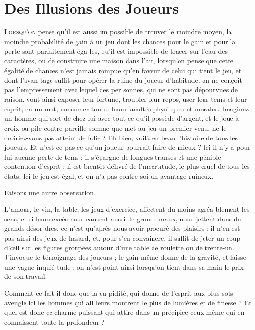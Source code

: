\chapter{Des Illusions des Joueurs}

\lettrine{L}{orsqu'on} pense qu'il est aussi im%
possible de trouver le moindre moyen,
la moindre probabilité de gain à un
jeu dont les chances pour le gain et
pour la perte sont parfaitement éga%
les, qu'il est impossible de tracer sur
l'eau des caractères, ou de construire
une maison dans l'air, lorsqu'on
pense que cette égalité de chances
n'est jamais rompue qu'en faveur de
celui qui tient le jeu, et dont l'avan%
tage suffit pour opérer la ruine du
joueur d'habitude, on ne conçoit pas
l'empressement avec lequel des per%
sonnes, qui ne sont pas dépourvues
de raison, vont ainsi exposer leur
fortune, troubler leur repos, user
leur tems et leur esprit, en un mot,
consumer toutes leurs facultés physi%
ques et morales. Imaginez un homme
qui sort de chez lui avec tout ce qu'il
possède d'argent, et le joue à croix
ou pile contre pareille somme que
met au jeu un premier venu, ne le
croiriez-vous pas atteint de folie ? Eh
bien, voilà en beau l'histoire de tous
les joueurs. Et n'est-ce pas ce qu'un
joueur pourrait faire de mieux ? Ici il
n'y a pour lui aucune perte de tems ;
il s'épargne de longues transes et
une pénible contention d'esprit ; il
est bientôt délivré de l'incertitude, le
plus cruel de tous les états. Ici le jeu
est égal, et on n'a pas contre soi un
avantage ruineux.

Faisons une autre observation.

L'amour, le vin, la table, les jeux
d'exercice, affectent du moins agréa%
blement les sens, et si leurs excès
nous causent aussi de grands maux,
nous jettent dans de grands désor%
dres, ce n'est qu'après nous avoir
procuré des plaisirs : il n'en est pas
ainsi des jeux de hasard, et, pour
s'en convaincre, il suffit de jeter un
coup-d'œil sur les figures groupées
autour d'une table de roulette ou de
trente-un. J'invoque le témoignage
des joueurs ; le gain même donne de
la gravité, et laisse une vague inquié%
tude : on n'est point ainsi lorsqu'on
tient dans sa main le prix de son
travail.

Comment ce fait-il donc que la cu%
pidité, qui donne de l'esprit aux plus
sots aveugle ici les hommes qui ail%
leurs montrent le plus de lumières et
de finesse ? Et quel est donc ce charme
puissant qui attire dans un précipice
ceux-même qui en connaissent toute
la profondeur ?

